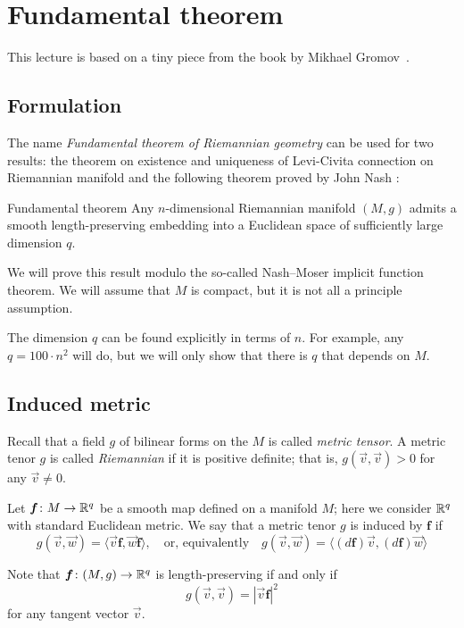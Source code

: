 \chapter{Fundamental theorem}

This lecture is based on a tiny piece from the book by Mikhael Gromov~\cite{gromov-1986}.

\section{Formulation}

The name \emph{Fundamental theorem of Riemannian geometry} can be used for two results: the theorem on existence and uniqueness of Levi-Civita connection on Riemannian manifold and the following theorem proved by John Nash \cite{nash-1956}:

\begin{thm}{Fundamental theorem}\label{thm:nash}
Any $n$-dimensional Riemannian manifold $(M,g)$ admits a smooth length-preserving embedding into a Euclidean space of sufficiently large dimension $q$.
\end{thm}

We will prove this result modulo the so-called  Nash--Moser implicit function theorem.
We will assume that $M$ is compact, but it is not all a principle assumption.

The dimension $q$ can be found explicitly in terms of $n$.
For example, any $q=100\cdot n^2$ will do, but we will only show that there is $q$ that depends on $M$.


\section{Induced metric}

Recall that a field $g$ of bilinear forms on the $M$ is called \emph{metric tensor}.
A metric tenor $g$ is called \emph{Riemannian} if it is positive definite;
that is, $g(\vec v,\vec v)>0$ for any $\vec v\ne 0$.

Let $\bm{f}\colon M\to\mathbb{R}^q$ be a smooth map defined on a manifold $M$; here we consider $\mathbb{R}^q$ with standard Euclidean metric.
We say that a metric tenor $g$ is induced by $\bm{f}$ if
\[g(\vec v,\vec w)=\langle \vec v\bm{f},\vec w\bm{f}\rangle,
\quad\text{or, equivalently}\quad
g(\vec v,\vec w)=\langle (d\bm{f})\vec v,(d\bm{f})\vec w\rangle\]

Note that $\bm{f}\colon(M,g)\to\mathbb{R}^q$ is length-preserving if and only if 
\[g(\vec v,\vec v)=|\vec v\bm{f}|^2\]
for any tangent vector $\vec v$.

